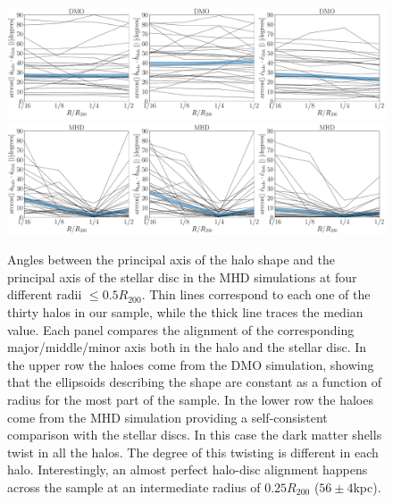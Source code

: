 \documentclass[usenatbib]{mnras}
\begin{document}
\begin{figure}
\begin{center}
\includegraphics[width=1.0\textwidth]{angles_alignment_DM.pdf}
\includegraphics[width=1.0\textwidth]{angles_alignment_MHD.pdf}
\end{center}
\caption{Angles between the
  principal axis of the halo shape and the principal axis of the
  stellar disc in the MHD simulations at four different radii $\leq 0.5R_{200}$.
  Thin lines correspond to each one of the thirty halos in our sample,
  while the thick line traces the median value.
  Each panel compares the alignment of the corresponding
  major/middle/minor axis both in the halo and the stellar disc.
  In the upper row the haloes come from the DMO simulation, 
  showing that the ellipsoids describing the
  shape are constant as a function of radius for the most part of the
  sample.
  In the lower row the haloes come from the MHD simulation providing a 
  self-consistent comparison with the stellar discs. 
  In this case the dark matter shells twist in all the halos.
  The degree of this twisting is different in each halo.
  Interestingly, an almost perfect halo-disc alignment happens across
  the sample at an intermediate radius of $0.25R_{200}$ ($56\pm 4$kpc).
}
\label{fig:cumulative_alignment}
\end{figure}
\end{document}
